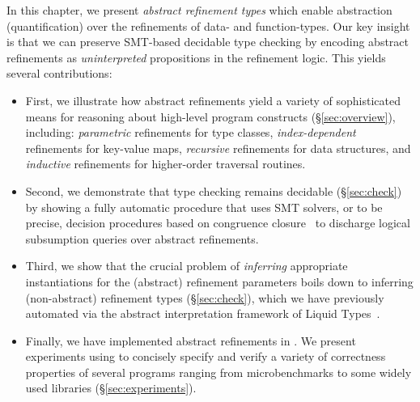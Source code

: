 In this chapter, we present \emph{abstract refinement types} 
which enable abstraction (quantification) over the refinements 
of data- and function-types. Our key insight is that we can 
preserve SMT-based decidable type checking by encoding 
abstract refinements as \emph{uninterpreted} propositions 
in the refinement logic. 
This yields several contributions:
%
\begin{itemize}
\item First, we illustrate how abstract refinements yield a variety 
of sophisticated means for reasoning about high-level program 
constructs (\S \ref{sec:overview}), including:
\emph{parametric} refinements for type classes,
\emph{index-dependent} refinements for key-value maps,
\emph{recursive} refinements for data structures, and
\emph{inductive} refinements for higher-order traversal routines.

\item Second, we demonstrate that type checking remains 
decidable (\S \ref{sec:check}) by showing a fully automatic
procedure that uses SMT solvers, or to be precise, 
decision procedures based on congruence closure~\cite{Nelson81}
to discharge logical subsumption queries over abstract refinements.
%
\item Third, we show that the crucial problem of \emph{inferring}
appropriate instantiations for the (abstract) refinement 
parameters boils down to inferring (non-abstract) refinement
types (\S \ref{sec:check}), which we have previously automated 
via the abstract interpretation framework of Liquid Types~\cite{LiquidPLDI08}. 
%
\item Finally, we have implemented abstract refinements in \toolname.
We present experiments using \toolname to concisely specify and 
verify a variety of correctness properties of several 
programs ranging from microbenchmarks to some widely 
used libraries (\S \ref{sec:experiments}).
\end{itemize}
